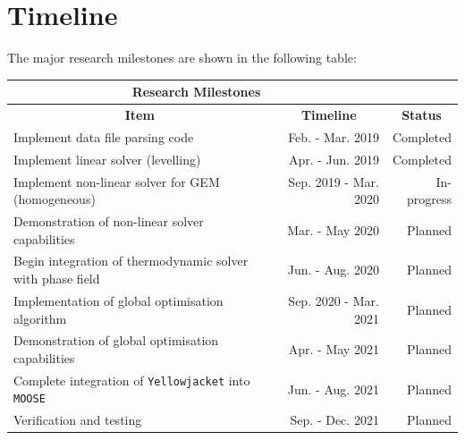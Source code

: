 \section*{Timeline}
The major research milestones are shown in the following table:
	\begin{table}[!htbp]
		\centering	
  		\begin{tabular}{@{}l r r@{}}
		\toprule
		\multicolumn{2}{c}{\textbf{Research Milestones}}\\
		\midrule
		\multicolumn{1}{c}{\textbf{Item}} & \multicolumn{1}{c}{\textbf{Timeline}} & \multicolumn{1}{c}{\textbf{Status}}\\
		\midrule

		Implement data file parsing code & Feb. - Mar. 2019 & Completed\\
		Implement linear solver (levelling) & Apr. - Jun. 2019 & Completed\\
		Implement non-linear solver for GEM (homogeneous) & Sep. 2019 - Mar. 2020 & In-progress\\
		Demonstration of non-linear solver capabilities & Mar. - May 2020 & Planned\\
		Begin integration of thermodynamic solver with phase field & Jun. - Aug. 2020 & Planned\\ 
		Implementation of global optimisation algorithm & Sep. 2020 - Mar. 2021 & Planned\\
		Demonstration of global optimisation capabilities & Apr. - May 2021 & Planned\\
		Complete integration of \texttt{Yellowjacket} into \texttt{MOOSE} & Jun. - Aug. 2021 & Planned\\
		Verification and testing & Sep. - Dec. 2021 & Planned\\
		\bottomrule
      		\end{tabular}
	\end{table}
	
